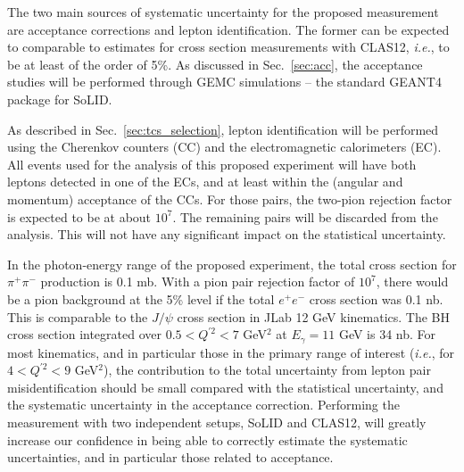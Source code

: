 The two main sources of systematic uncertainty for the proposed measurement
are acceptance corrections and lepton identification. The former can be
expected to comparable to estimates for cross section measurements with
CLAS12, \textit{i.e.}, to be at least of the order of 5\%. As discussed in
Sec.~\ref{sec:acc}, the acceptance studies will be performed through GEMC
simulations -- the standard GEANT4 package for SoLID.

As described in Sec.~\ref{sec:tcs_selection}, lepton identification will be
performed using the Cherenkov counters (CC) and the electromagnetic
calorimeters (EC). All events used for the analysis of this proposed
experiment will have both leptons detected in one of the ECs, and at least
within the (angular and momentum) acceptance of the CCs. For those pairs, the
two-pion rejection factor is expected to be at about $10^7$. The
remaining pairs will be discarded from the analysis. This will not have any
significant impact on the statistical uncertainty.

In the photon-energy range of the proposed experiment, the total cross section
for $\pi^+\pi^-$ production is 0.1 mb. With a pion pair rejection factor of
$10^7$, there would be a pion background at the 5\% level if the
total $e^+e^-$ cross section was 0.1 nb. This is comparable to the $J/\psi$
cross section in JLab 12 GeV kinematics. The BH cross section integrated over
$0.5 < Q^{\prime 2} < 7$ GeV$^2$ at $E_\gamma = 11$ GeV is 34 nb. For most
kinematics, and in particular those in the primary range of interest
(\textit{i.e.}, for $4 < Q^{\prime 2} < 9$ GeV$^2$), the contribution to the
total uncertainty from lepton pair misidentification should be small compared
with the statistical uncertainty, and the systematic uncertainty in the
acceptance correction. Performing the measurement with two independent setups,
SoLID and CLAS12, will greatly increase our confidence in being able to
correctly estimate the systematic uncertainties, and in particular those
related to acceptance.
